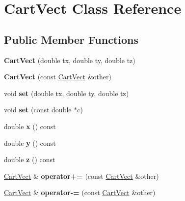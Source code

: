 \hypertarget{class_cart_vect}{}\section{Cart\+Vect Class Reference}
\label{class_cart_vect}
\subsection*{Public Member Functions}
\begin{DoxyCompactItemize}
\item 
\mbox{\label{class_cart_vect_a351be5105a9a3e78a7c0a9533def6e66}} 
{\bfseries Cart\+Vect} (double tx, double ty, double tz)
\item 
\mbox{\label{class_cart_vect_af839cba7f50710184a38c3a89adc09a2}} 
{\bfseries Cart\+Vect} (const \hyperlink{class_cart_vect}{Cart\+Vect} \&other)
\item 
\mbox{\label{class_cart_vect_a9b6a99c3816313c4f275253c3776c5dc}} 
void {\bfseries set} (double tx, double ty, double tz)
\item 
\mbox{\label{class_cart_vect_aa81d103c69feb259097d69af5fab7a4a}} 
void {\bfseries set} (const double $\ast$c)
\item 
\mbox{\label{class_cart_vect_aa05ded2cfdfbf43a0783e60a79f1bea9}} 
double {\bfseries x} () const
\item 
\mbox{\label{class_cart_vect_a3cbf2df0b4a8acf81cfcd9faf0711080}} 
double {\bfseries y} () const
\item 
\mbox{\label{class_cart_vect_a37aef799474b9407f26f76d5e6390b74}} 
double {\bfseries z} () const
\item 
\mbox{\label{class_cart_vect_a73a67dfc715f81197258a4a1264fe218}} 
\hyperlink{class_cart_vect}{Cart\+Vect} \& {\bfseries operator+=} (const \hyperlink{class_cart_vect}{Cart\+Vect} \&other)
\item 
\mbox{\label{class_cart_vect_a459252305cedf4e95a997bd46a26e9b8}} 
\hyperlink{class_cart_vect}{Cart\+Vect} \& {\bfseries operator-\/=} (const \hyperlink{class_cart_vect}{Cart\+Vect} \&other)

\end{DoxyCompactItemize}
